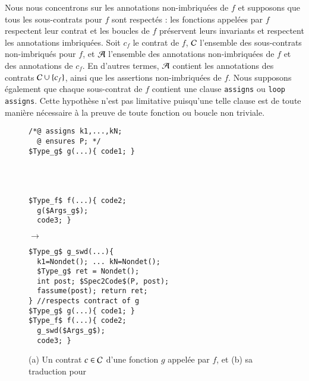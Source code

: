Nous nous concentrons sur les annotations non-imbriquées de $f$ et supposons que
tous les sous-contrats pour $f$ sont respectés : les fonctions appelées par $f$
respectent leur contrat et les boucles de $f$ préservent leurs invariants et
respectent les annotations imbriquées.
Soit $c_f$ le contrat de $f$, ${\mathcal{C}}$ l'ensemble des sous-contrats non-imbriqués
pour $f$, et ${\mathcal{A}}$ l'ensemble des annotations non-imbriquées de $f$ et des
annotations de $c_f$.
En d'autres termes, ${\mathcal{A}}$ contient les annotations des contrats ${\mathcal{C}}\cup\{c_f\}$,
ainsi que les assertions non-imbriquées de $f$.
Nous supposons également que chaque sous-contrat de $f$ contient une clause
\lstinline'assigns' ou \lstinline'loop assigns'.
Cette hypothèse n'est pas limitative puisqu'une telle clause est de toute
manière nécessaire à la preuve de toute fonction ou boucle non triviale.


\begin{figure}[tb]
\begin{center}
\begin{minipage}{0.35\columnwidth}
\begin{lstlisting}[mathescape]
/*@ assigns k1,...,kN;
  @ ensures P; */
$Type_g$ g(...){ code1; }




$Type_f$ f(...){ code2;
  g($Args_g$);
  code3; }
\end{lstlisting}
\end{minipage}
\hspace{-6mm}
\begin{minipage}{0.07\columnwidth}$\to$\end{minipage}
\begin{minipage}{0.35\columnwidth}
\begin{lstlisting}[mathescape]
$Type_g$ g_swd(...){
  k1=Nondet(); ... kN=Nondet();
  $Type_g$ ret = Nondet();
  int post; $Spec2Code$(P, post);
  fassume(post); return ret;
} //respects contract of g
$Type_g$ g(...){ code1; }
$Type_f$ f(...){ code2;
  g_swd($Args_g$);
  code3; }
\end{lstlisting}
\end{minipage}
\vspace{-3mm}
\caption{(a) Un contrat $c\in{\ensuremath\mathcal{C}}$ d'une fonction $g$ appelée par $f$, et
(b) sa traduction %
pour \CWD}
\vspace{-3mm}
\label{fig:CW-transf-functions}
\end{center}
\end{figure}



